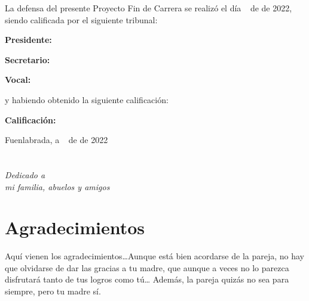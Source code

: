 \documentclass[a4paper, 12pt]{book}
\begin{document}
\vspace{1cm}
La defensa del presente Proyecto Fin de Carrera se realizó el día \qquad$\;\,$ de \qquad\qquad\qquad\qquad \newline de 2022, siendo calificada por el siguiente tribunal:


\vspace{0.5cm}
\textbf{Presidente:}

\vspace{1.2cm}
\textbf{Secretario:}

\vspace{1.2cm}
\textbf{Vocal:}


\vspace{1.2cm}
y habiendo obtenido la siguiente calificación:

\vspace{1cm}
\textbf{Calificación:}


\vspace{1cm}
\begin{flushright}
Fuenlabrada, a \qquad$\;\,$ de \qquad\qquad\qquad\qquad de 2022
\end{flushright}


\chapter*{}
\begin{flushright}
\textit{Dedicado a \\
mi familia, abuelos y amigos}
\end{flushright}


\chapter*{Agradecimientos}

Aquí vienen los agradecimientos\ldots Aunque está bien acordarse de la pareja, no hay que olvidarse de dar las gracias a tu madre, que aunque a veces no lo parezca disfrutará tanto de tus logros como tú\ldots 
Además, la pareja quizás no sea para siempre, pero tu madre sí.
\end{document}

